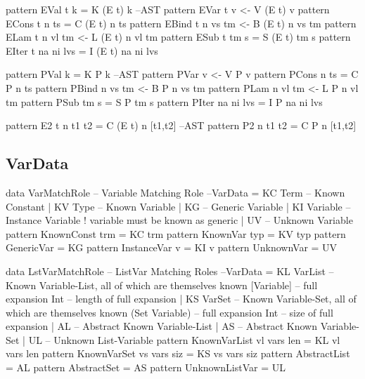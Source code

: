 \begin{code}
pattern EVal t k           =  K (E t) k                                  --AST
pattern EVar t v          <-  V (E t) v
pattern ECons t n ts       =  C (E t) n ts
pattern EBind t n vs tm   <-  B (E t) n vs tm
pattern ELam t n vl tm    <-  L (E t) n vl tm
pattern ESub t tm s        =  S (E t) tm s
pattern EIter t na ni lvs  =  I (E t) na ni lvs
\end{code}

\newpage
\begin{code}
pattern PVal k             =  K P k                                      --AST
pattern PVar v            <-  V P v
pattern PCons n ts         =  C P n ts
pattern PBind n vs tm     <-  B P n vs tm
pattern PLam n vl tm      <-  L P n vl tm
pattern PSub tm s          =  S P tm s
pattern PIter na ni lvs    =  I P na ni lvs
\end{code}

\begin{code}
pattern E2 t n t1 t2  = C (E t) n [t1,t2]                                --AST
pattern P2   n t1 t2  = C P     n [t1,t2]
\end{code}


\subsection{VarData}

\begin{code}
data VarMatchRole -- Variable Matching Role                          --VarData
  =  KC Term     -- Known Constant
  |  KV Type     -- Known Variable
  |  KG          -- Generic Variable
  |  KI Variable -- Instance Variable ! variable must be known as generic
  |  UV          -- Unknown Variable
pattern KnownConst trm = KC trm
pattern KnownVar typ   = KV typ
pattern GenericVar     = KG
pattern InstanceVar v  = KI v
pattern UnknownVar     = UV
\end{code}

\begin{code}
data LstVarMatchRole -- ListVar Matching Roles                       --VarData
 = KL VarList        -- Known Variable-List, all of which are themselves known
      [Variable]     -- full expansion
      Int            -- length of full expansion
 | KS VarSet         -- Known Variable-Set, all of which are themselves known
      (Set Variable) -- full expansion
      Int            -- size of full expansion
 | AL                -- Abstract Known Variable-List
 | AS                -- Abstract Known Variable-Set
 | UL                -- Unknown List-Variable
pattern KnownVarList vl vars len  =  KL vl vars len
pattern KnownVarSet  vs vars siz  =  KS vs vars siz
pattern AbstractList              =  AL
pattern AbstractSet               =  AS
pattern UnknownListVar            =  UL
\end{code}

